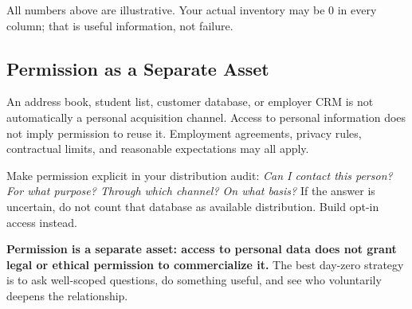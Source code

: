 All numbers above are illustrative. Your actual inventory may be 0 in every column; that is useful information, not failure.

\subsection{Permission as a Separate Asset}

An address book, student list, customer database, or employer CRM is not automatically a personal acquisition channel. Access to personal information does not imply permission to reuse it. Employment agreements, privacy rules, contractual limits, and reasonable expectations may all apply.

Make permission explicit in your distribution audit: \textit{Can I contact this person? For what purpose? Through which channel? On what basis?} If the answer is uncertain, do not count that database as available distribution. Build opt-in access instead.

\textbf{Permission is a separate asset: access to personal data does not grant legal or ethical permission to commercialize it.} The best day-zero strategy is to ask well-scoped questions, do something useful, and see who voluntarily deepens the relationship.
